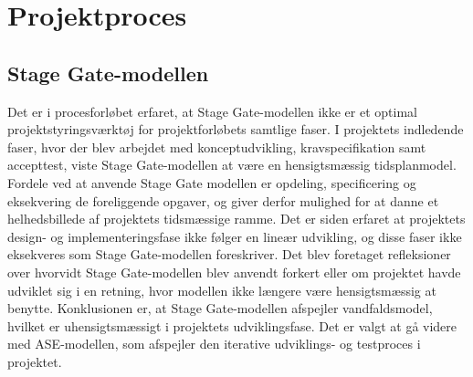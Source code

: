 \chapter{Projektproces}

\section{Stage Gate-modellen}

Det er i procesforløbet erfaret, at Stage Gate-modellen ikke er et optimal  projektstyringsværktøj for projektforløbets samtlige faser.
I projektets indledende faser, hvor der blev arbejdet med konceptudvikling, kravspecifikation samt accepttest, viste Stage Gate-modellen at være en hensigtsmæssig tidsplanmodel. Fordele ved at anvende Stage Gate modellen er opdeling, specificering og eksekvering de foreliggende opgaver, og giver derfor mulighed for at danne et helhedsbillede af projektets tidsmæssige ramme. Det er siden erfaret at projektets design- og implementeringsfase ikke følger en lineær udvikling, og disse faser ikke eksekveres som Stage Gate-modellen foreskriver. Det blev foretaget refleksioner over hvorvidt Stage Gate-modellen blev anvendt forkert eller om projektet havde udviklet sig i en retning, hvor modellen ikke længere være hensigtsmæssig at benytte. Konklusionen er, at Stage Gate-modellen afspejler vandfaldsmodel, hvilket er uhensigtsmæssigt i projektets udviklingsfase. Det er valgt at gå videre med ASE-modellen, som afspejler den iterative udviklings- og testproces i projektet. 


